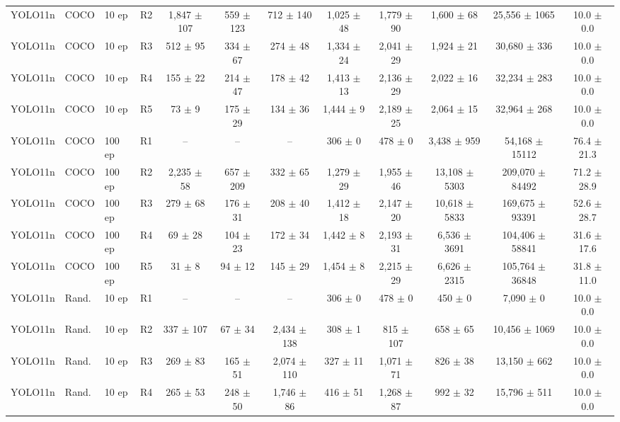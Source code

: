 \begin{table}[hbt!]
\begin{tabular}{lllccccccccc}
YOLO11n & COCO & 10 ep & R2 & 1,847 $\pm$ 107 & 559 $\pm$ 123 & 712 $\pm$ 140 & 1,025 $\pm$ 48 & 1,779 $\pm$ 90 & 1,600 $\pm$ 68 & 25,556 $\pm$ 1065 & 10.0 $\pm$ 0.0 \\
YOLO11n & COCO & 10 ep & R3 & 512 $\pm$ 95 & 334 $\pm$ 67 & 274 $\pm$ 48 & 1,334 $\pm$ 24 & 2,041 $\pm$ 29 & 1,924 $\pm$ 21 & 30,680 $\pm$ 336 & 10.0 $\pm$ 0.0 \\
YOLO11n & COCO & 10 ep & R4 & 155 $\pm$ 22 & 214 $\pm$ 47 & 178 $\pm$ 42 & 1,413 $\pm$ 13 & 2,136 $\pm$ 29 & 2,022 $\pm$ 16 & 32,234 $\pm$ 283 & 10.0 $\pm$ 0.0 \\
YOLO11n & COCO & 10 ep & R5 & 73 $\pm$ 9 & 175 $\pm$ 29 & 134 $\pm$ 36 & 1,444 $\pm$ 9 & 2,189 $\pm$ 25 & 2,064 $\pm$ 15 & 32,964 $\pm$ 268 & 10.0 $\pm$ 0.0 \\
\midrule
YOLO11n & COCO & 100 ep & R1 & {--} & {--} & {--} & 306 $\pm$ 0 & 478 $\pm$ 0 & 3,438 $\pm$ 959 & 54,168 $\pm$ 15112 & 76.4 $\pm$ 21.3 \\
YOLO11n & COCO & 100 ep & R2 & 2,235 $\pm$ 58 & 657 $\pm$ 209 & 332 $\pm$ 65 & 1,279 $\pm$ 29 & 1,955 $\pm$ 46 & 13,108 $\pm$ 5303 & 209,070 $\pm$ 84492 & 71.2 $\pm$ 28.9 \\
YOLO11n & COCO & 100 ep & R3 & 279 $\pm$ 68 & 176 $\pm$ 31 & 208 $\pm$ 40 & 1,412 $\pm$ 18 & 2,147 $\pm$ 20 & 10,618 $\pm$ 5833 & 169,675 $\pm$ 93391 & 52.6 $\pm$ 28.7 \\
YOLO11n & COCO & 100 ep & R4 & 69 $\pm$ 28 & 104 $\pm$ 23 & 172 $\pm$ 34 & 1,442 $\pm$ 8 & 2,193 $\pm$ 31 & 6,536 $\pm$ 3691 & 104,406 $\pm$ 58841 & 31.6 $\pm$ 17.6 \\
YOLO11n & COCO & 100 ep & R5 & 31 $\pm$ 8 & 94 $\pm$ 12 & 145 $\pm$ 29 & 1,454 $\pm$ 8 & 2,215 $\pm$ 29 & 6,626 $\pm$ 2315 & 105,764 $\pm$ 36848 & 31.8 $\pm$ 11.0 \\
\midrule
YOLO11n & Rand. & 10 ep & R1 & {--} & {--} & {--} & 306 $\pm$ 0 & 478 $\pm$ 0 & 450 $\pm$ 0 & 7,090 $\pm$ 0 & 10.0 $\pm$ 0.0 \\
YOLO11n & Rand. & 10 ep & R2 & 337 $\pm$ 107 & 67 $\pm$ 34 & 2,434 $\pm$ 138 & 308 $\pm$ 1 & 815 $\pm$ 107 & 658 $\pm$ 65 & 10,456 $\pm$ 1069 & 10.0 $\pm$ 0.0 \\
YOLO11n & Rand. & 10 ep & R3 & 269 $\pm$ 83 & 165 $\pm$ 51 & 2,074 $\pm$ 110 & 327 $\pm$ 11 & 1,071 $\pm$ 71 & 826 $\pm$ 38 & 13,150 $\pm$ 662 & 10.0 $\pm$ 0.0 \\
YOLO11n & Rand. & 10 ep & R4 & 265 $\pm$ 53 & 248 $\pm$ 50 & 1,746 $\pm$ 86 & 416 $\pm$ 51 & 1,268 $\pm$ 87 & 992 $\pm$ 32 & 15,796 $\pm$ 511 & 10.0 $\pm$ 0.0 \\

\end{tabular}
\end{table}

